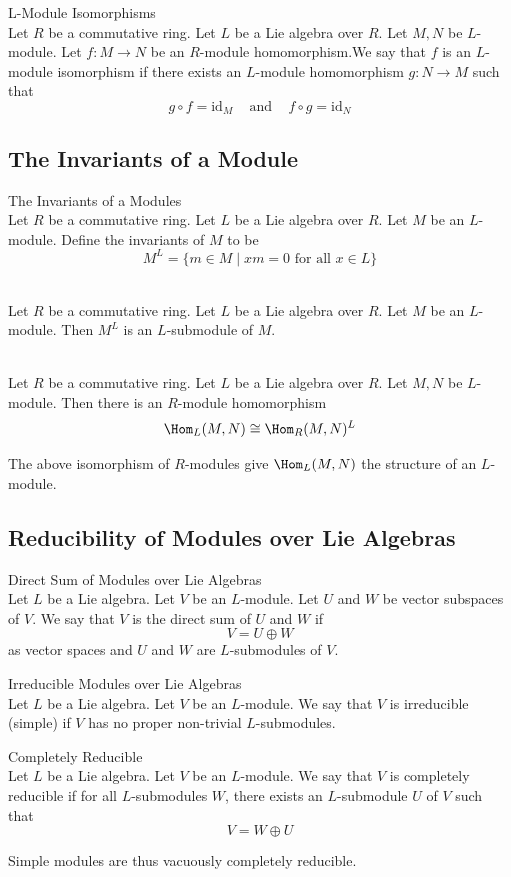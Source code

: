 \documentclass[a4paper]{article}
\begin{document}
\begin{defn}{L-Module Isomorphisms}{}\\
Let $R$ be a commutative ring. Let $L$ be a Lie algebra over $R$. Let $M,N$ be $L$-module. Let $f:M\to N$ be an $R$-module homomorphism.We say that $f$ is an $L$-module isomorphism if there exists an $L$-module homomorphism $g:N\to M$ such that $$g\circ f=\text{id}_M\;\;\;\text{ and }\;\;\;f\circ g=\text{id}_N$$
\end{defn}

\subsection{The Invariants of a Module}
\begin{defn}{The Invariants of a Modules}{}\\
Let $R$ be a commutative ring. Let $L$ be a Lie algebra over $R$. Let $M$ be an $L$-module. Define the invariants of $M$ to be $$M^L=\{m\in M\;|\;xm=0\text{ for all }x\in L\}$$
\end{defn}

\begin{lmm}{}{}\\
Let $R$ be a commutative ring. Let $L$ be a Lie algebra over $R$. Let $M$ be an $L$-module. Then $M^L$ is an $L$-submodule of $M$. 
\end{lmm}

\begin{lmm}{}{}\\
Let $R$ be a commutative ring. Let $L$ be a Lie algebra over $R$. Let $M,N$ be $L$-module. Then there is an $R$-module homomorphism $$\Hom_L(M,N)\cong\Hom_R(M,N)^L$$
\end{lmm}

The above isomorphism of $R$-modules give $\Hom_L(M,N)$ the structure of an $L$-module. 

\subsection{Reducibility of Modules over Lie Algebras}
\begin{defn}{Direct Sum of Modules over Lie Algebras}{} \\Let $L$ be a Lie algebra. Let $V$ be an $L$-module. Let $U$ and $W$ be vector subspaces of $V$. We say that $V$ is the direct sum of $U$ and $W$ if $$V=U\oplus W$$ as vector spaces and $U$ and $W$ are $L$-submodules of $V$. 
\end{defn}

\begin{defn}{Irreducible Modules over Lie Algebras}{} \\Let $L$ be a Lie algebra. Let $V$ be an $L$-module. We say that $V$ is irreducible (simple) if $V$ has no proper non-trivial $L$-submodules. 
\end{defn}

\begin{defn}{Completely Reducible}{} \\Let $L$ be a Lie algebra. Let $V$ be an $L$-module. We say that $V$ is completely reducible if for all $L$-submodules $W$, there exists an $L$-submodule $U$ of $V$ such that $$V=W\oplus U$$
\end{defn}

Simple modules are thus vacuously completely reducible. 
\end{document}
